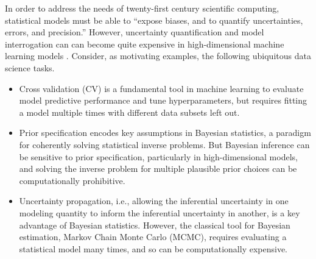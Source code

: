 In order to address the needs of twenty-first century scientific computing,
statistical models must be able to ``expose biases, and to quantify
uncertainties, errors, and precision.'' \citep{committee:2020:report} However,
uncertainty quantification and model interrogation can can become quite
expensive in high-dimensional machine learning models \citep[Section
2.4]{baker:2019:workshop}. Consider, as motivating examples, the following
ubiquitous data science tasks.
%
\begin{itemize}
%
        \item Cross validation (CV) is a fundamental tool in machine learning to
        evaluate model predictive performance and tune hyperparameters, but
        requires fitting a model multiple times with different data subsets left
        out.
        \item  Prior specification encodes key assumptions in Bayesian
        statistics, a paradigm for coherently solving statistical
        inverse problems.  But Bayesian inference can be sensitive to prior
        specification, particularly in high-dimensional models, and solving the
        inverse problem for multiple plausible prior choices can be
        computationally prohibitive.
        \item Uncertainty propagation, i.e., allowing the inferential
        uncertainty in one modeling quantity to inform the inferential
        uncertainty in another, is a key advantage of Bayesian statistics.
        However, the classical tool for Bayesian estimation, Markov Chain Monte
        Carlo (MCMC), requires evaluating a statistical model many times, and so
        can be computationally expensive.
%
\end{itemize}
%

